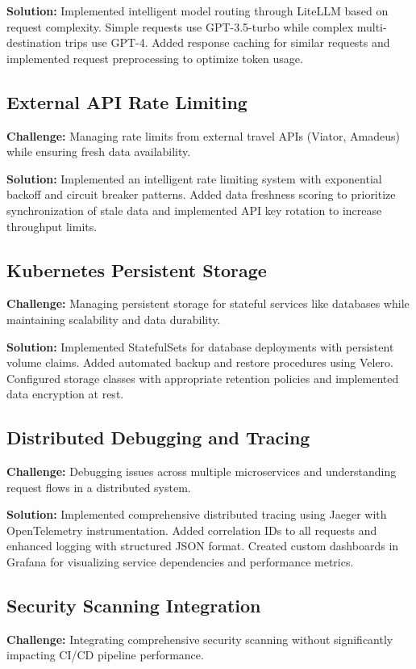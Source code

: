 \textbf{Solution:} Implemented intelligent model routing through LiteLLM based on request complexity. Simple requests use GPT-3.5-turbo while complex multi-destination trips use GPT-4. Added response caching for similar requests and implemented request preprocessing to optimize token usage.

\subsection{External API Rate Limiting}
\textbf{Challenge:} Managing rate limits from external travel APIs (Viator, Amadeus) while ensuring fresh data availability.

\textbf{Solution:} Implemented an intelligent rate limiting system with exponential backoff and circuit breaker patterns. Added data freshness scoring to prioritize synchronization of stale data and implemented API key rotation to increase throughput limits.

\subsection{Kubernetes Persistent Storage}
\textbf{Challenge:} Managing persistent storage for stateful services like databases while maintaining scalability and data durability.

\textbf{Solution:} Implemented StatefulSets for database deployments with persistent volume claims. Added automated backup and restore procedures using Velero. Configured storage classes with appropriate retention policies and implemented data encryption at rest.

\subsection{Distributed Debugging and Tracing}
\textbf{Challenge:} Debugging issues across multiple microservices and understanding request flows in a distributed system.

\textbf{Solution:} Implemented comprehensive distributed tracing using Jaeger with OpenTelemetry instrumentation. Added correlation IDs to all requests and enhanced logging with structured JSON format. Created custom dashboards in Grafana for visualizing service dependencies and performance metrics.

\subsection{Security Scanning Integration}
\textbf{Challenge:} Integrating comprehensive security scanning without significantly impacting CI/CD pipeline performance.

